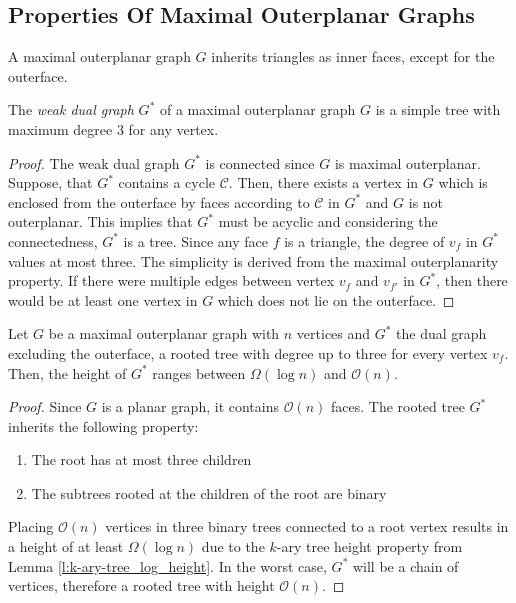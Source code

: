 \subsection{Properties Of Maximal Outerplanar Graphs}
\begin{lemma}
	A maximal outerplanar graph $G$ inherits triangles as inner faces, except for the outerface.
\end{lemma}
\begin{lemma}\label{l:outerplanar-dual-tree-degree-3}
	The \emph{weak dual graph} $G^*$ of a maximal outerplanar graph $G$ is a simple tree with maximum degree 3 for any vertex.
\end{lemma}
\begin{proof}
	The weak dual graph $G^*$ is connected since $G$ is maximal outerplanar. Suppose, that $G^*$ contains a cycle $\mathcal{C}$. Then, there exists a vertex in $G$ which is enclosed from the outerface by faces according to $\mathcal{C}$ in $G^*$ and $G$ is not outerplanar. This implies that $G^*$ must be acyclic and considering the connectedness, $G^*$ is a tree. Since any face $f$ is a triangle, the degree of $v_f$ in $G^*$ values at most three. The simplicity is derived from the maximal outerplanarity property. If there were multiple edges between vertex $v_f$ and $v_{f'}$ in $G^*$, then there would be at least one vertex in $G$ which does not lie on the outerface.
\end{proof}
\begin{lemma}
	Let $G$ be a maximal outerplanar graph with $n$ vertices and $G^*$ the dual graph excluding the outerface, a rooted tree with degree up to three for every vertex $v_f$. Then, the height of $G^*$ ranges between $\Omega(\log n)$ and $\mathcal{O}(n)$.
\end{lemma}
\begin{proof}
	Since $G$ is a planar graph, it contains $\mathcal{O}(n)$ faces. The rooted tree $G^*$ inherits the following property:
	\begin{enumerate}
		\item The root has at most three children
		\item The subtrees rooted at the children of the root are binary
	\end{enumerate}
	Placing $\mathcal{O}(n)$ vertices in three binary trees connected to a root vertex results in a height of at least $\Omega(\log n)$ due to the $k$-ary tree height property from Lemma \ref{l:k-ary-tree_log_height}. In the worst case, $G^*$ will be a chain of vertices, therefore a rooted tree with height $\mathcal{O}(n)$.
\end{proof}

